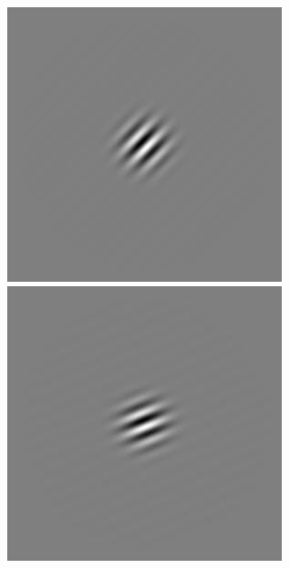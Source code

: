 \begin{figure}[ht]
\begin{center}
 \includegraphics[width=\columnwidth/9]{ch4/figures/iGabor3_2.jpg}
 \includegraphics[width=\columnwidth/9]{ch4/figures/iGabor3_3.jpg}

\end{center}
\end{figure}
